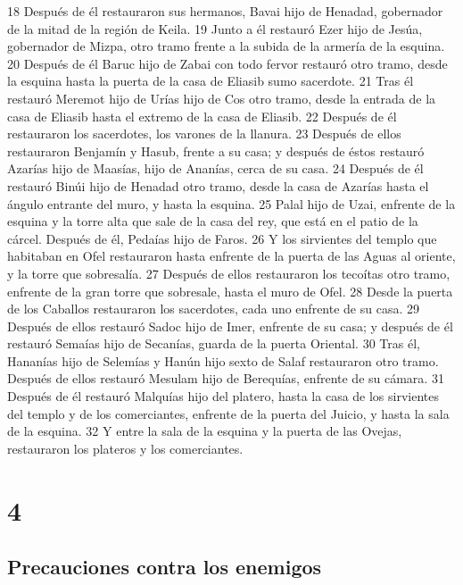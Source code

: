 18 Después de él restauraron sus hermanos, Bavai hijo de Henadad, gobernador de la mitad de la región de Keila.
19 Junto a él restauró Ezer hijo de Jesúa, gobernador de Mizpa, otro tramo frente a la subida de la armería de la esquina.
20 Después de él Baruc hijo de Zabai con todo fervor restauró otro tramo, desde la esquina hasta la puerta de la casa de Eliasib sumo sacerdote.
21 Tras él restauró Meremot hijo de Urías hijo de Cos otro tramo, desde la entrada de la casa de Eliasib hasta el extremo de la casa de Eliasib.
22 Después de él restauraron los sacerdotes, los varones de la llanura.
23 Después de ellos restauraron Benjamín y Hasub, frente a su casa; y después de éstos restauró Azarías hijo de Maasías, hijo de Ananías, cerca de su casa.
24 Después de él restauró Binúi hijo de Henadad otro tramo, desde la casa de Azarías hasta el ángulo entrante del muro, y hasta la esquina.
25 Palal hijo de Uzai, enfrente de la esquina y la torre alta que sale de la casa del rey, que está en el patio de la cárcel. Después de él, Pedaías hijo de Faros.
26 Y los sirvientes del templo que habitaban en Ofel restauraron hasta enfrente de la puerta de las Aguas al oriente, y la torre que sobresalía.
27 Después de ellos restauraron los tecoítas otro tramo, enfrente de la gran torre que sobresale, hasta el muro de Ofel.
28 Desde la puerta de los Caballos restauraron los sacerdotes, cada uno enfrente de su casa.
29 Después de ellos restauró Sadoc hijo de Imer, enfrente de su casa; y después de él restauró Semaías hijo de Secanías, guarda de la puerta Oriental.
30 Tras él, Hananías hijo de Selemías y Hanún hijo sexto de Salaf restauraron otro tramo. Después de ellos restauró Mesulam hijo de Berequías, enfrente de su cámara.
31 Después de él restauró Malquías hijo del platero, hasta la casa de los sirvientes del templo y de los comerciantes, enfrente de la puerta del Juicio, y hasta la sala de la esquina.
32 Y entre la sala de la esquina y la puerta de las Ovejas, restauraron los plateros y los comerciantes.

\chapter{4}

\section*{Precauciones contra los enemigos}

